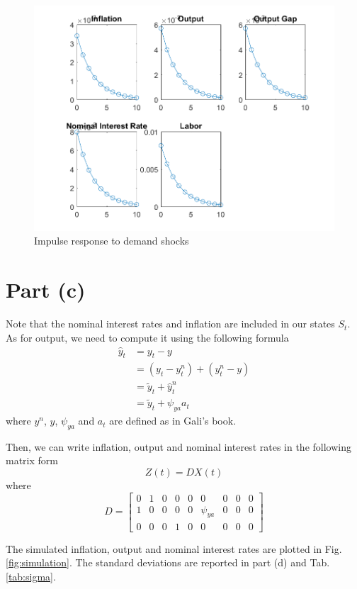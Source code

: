 \documentclass[12pt]{article}
\theoremstyle{definition}
\newcommand{\bra}[1]{\left[#1\right]}
\newcommand{\mat}[1]{\begin{matrix}#1\end{matrix}}
\newcommand{\bmat}[1]{\bra{\mat{#1}}}
\begin{document}
\begin{figure}[H]
	\centering
	\includegraphics[width=\linewidth, height=0.4\textheight]{impulse_demand}
	\caption{Impulse response to demand shocks}
	\label{fig:impulse_demand}
\end{figure}

\section*{Part (c)}

Note that the nominal interest rates and inflation are included in our states $S_t$. As for output, we need to compute it using the following formula
\begin{align*}
\hat{y}_t &= y_t-y\\
&= (y_t-y_t^n)+(y_t^n-y)\\
&= \tilde{y}_t+\hat{y}^n_t\\
&= \tilde{y}_t+\psi_{ya}a_t
\end{align*}
where $y^n$, $y$, $\psi_{ya}$ and $a_t$ are defined as in Gali's book. 

Then, we can write inflation, output and nominal interest rates in the following matrix form
\[
Z(t) = DX(t)
\]
where 
\[
D = \bmat{0& 1& 0& 0& 0& 0& 0& 0& 0\\
	1& 0& 0& 0& 0& \psi_{ya}& 0& 0& 0\\
	0 &0& 0& 1& 0& 0& 0& 0& 0}
\]

The simulated inflation, output and nominal interest rates are plotted in Fig.\ref{fig:simulation}. The standard deviations are reported in part (d) and Tab.\ref{tab:sigma}.
\end{document}
